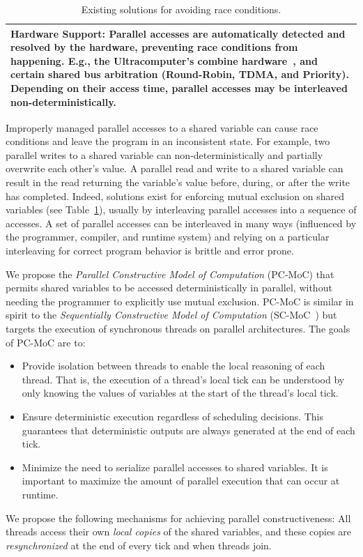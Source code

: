 \begin{table}[t]
\begin{tabular}{| p{\textwidth} |}
		\textbf{Hardware Support:}
		Parallel accesses are automatically detected and resolved by the hardware, preventing
		race conditions from happening. E.g., the Ultracomputer's combine hardware~\cite{Schwartz80}, 
		and certain shared bus arbitration (Round-Robin, TDMA, and Priority). Depending on their 
		access time, parallel accesses may be interleaved non-deterministically.			\\
		\hline
	\end{tabular}

	\caption{Existing solutions for avoiding race conditions.}
	\label{table:forec_mutual_exclusion}
\end{table}

Improperly managed parallel accesses to a shared variable
can cause race conditions and leave the program in an
inconsistent state. For example, two parallel writes to a
shared variable can non-deterministically and partially
overwrite each other's value. A parallel read and write to a
shared variable can result in the read returning the
variable's value before, during, or after the write has
completed. Indeed, solutions exist for enforcing mutual
exclusion on shared variables (see
Table~\ref{table:forec_mutual_exclusion}), usually by
interleaving parallel accesses into a sequence of accesses.
A set of parallel accesses can be interleaved in many ways
(influenced by the programmer, compiler, and runtime system)
and relying on a particular interleaving for correct program
behavior is brittle and error prone.

We propose the \emph{Parallel Constructive Model of Computation} (PC-MoC) that 
permits shared variables to be accessed deterministically in parallel, without 
needing the programmer to explicitly use mutual exclusion. PC-MoC is similar in 
spirit to the \emph{Sequentially Constructive Model of Computation} 
(SC-MoC~\cite{timed_seq_concurrency}) but targets the execution of synchronous 
threads on parallel architectures. The goals of PC-MoC are to: 
\begin{itemize}
	\item Provide isolation between threads to enable the local reasoning of each thread.
		  That is, the execution of a thread's local tick can be understood by only knowing 
		  the values of variables at the start of the thread's local tick.

	\item Ensure deterministic execution regardless of scheduling decisions. This guarantees 
		  that deterministic outputs are always generated at the end of each tick.

	\item Minimize the need to serialize parallel accesses to shared variables. It is
		  important to maximize the amount of parallel execution that can occur at runtime.
\end{itemize}
We propose the following mechanisms for achieving parallel constructiveness: 
All threads access their own \emph{local copies} of the shared variables, and these 
copies are \emph{resynchronized} at the end of every tick and when threads join.

